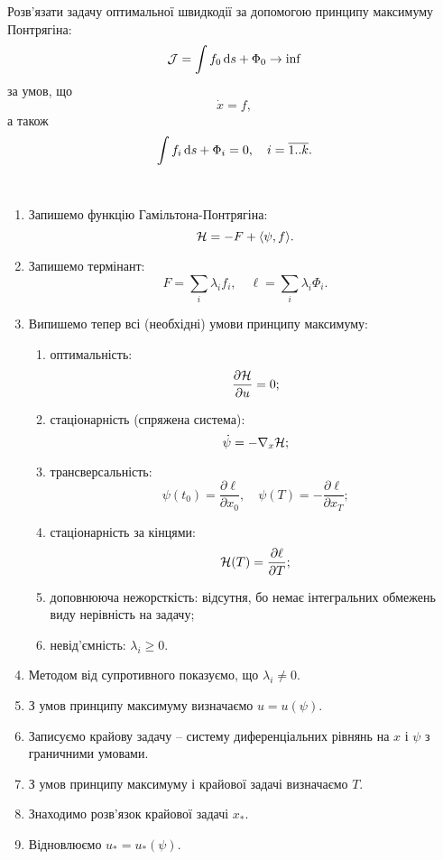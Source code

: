 \begin{problem*}
	Розв'язати задачу оптимальної швидкодії за допомогою принципу максимуму Понтрягіна: \[ \mathcal{J}  = \int f_0 \mathop{}\!\mathrm{d} s + \Phi_0 \to \inf \] за умов, що \[ \dot x = f, \] а також \[ \int f_i \mathop{}\!\mathrm{d} s + \Phi_i = 0 , \quad i = \overline{1..k}. \]
\end{problem*}


\begin{algorithm} \tt
	\begin{enumerate}
		\item Запишемо функцію Гамільтона-Понтрягіна: \[ \mathcal{H} = -F + \langle \psi, f \rangle. \]
		\item Запишемо термінант: \[ F = \sum_i \lambda_i f_i, \quad \ell = \sum_i \lambda_i \Phi_i. \]
		\item Випишемо тепер всі (необхідні) умови принципу максимуму:
		\begin{enumerate}
			\item оптимальність: \[\frac{\partial \mathcal{H}}{\partial u} = 0;\]
			\item стаціонарність (спряжена система): \[\dot \psi = - \nabla_x \mathcal{H};\]
			\item трансверсальність: \[\psi(t_0) = \frac{\partial \ell}{\partial x_0}, \quad \psi(T) = - \frac{\partial \ell}{\partial x_T};\]
			\item стаціонарність за кінцями: \[ \mathcal{H}(T) = \frac{\partial \ell}{\partial T}; \]
			\item доповнююча нежорсткість: відсутня, бо немає інтегральних \allowbreak об\-ме\-жень виду нерівність на задачу;
			\item невід'ємність: $\lambda_i \ge 0$.
		\end{enumerate}
		\item Методом від супротивного показуємо, що $\lambda_i \ne 0$.
		\item З умов принципу максимуму визначаємо $u = u(\psi)$.
		\item Записуємо крайову задачу -- систему диференціальних рівнянь на $x$ і $\psi$ з граничними умовами.
		\item З умов принципу максимуму і крайової задачі визначаємо $T$.
		\item Знаходимо розв'язок крайової задачі $x_*$.
		\item Відновлюємо $u_* = u_*(\psi)$.
	\end{enumerate}
\end{algorithm}



